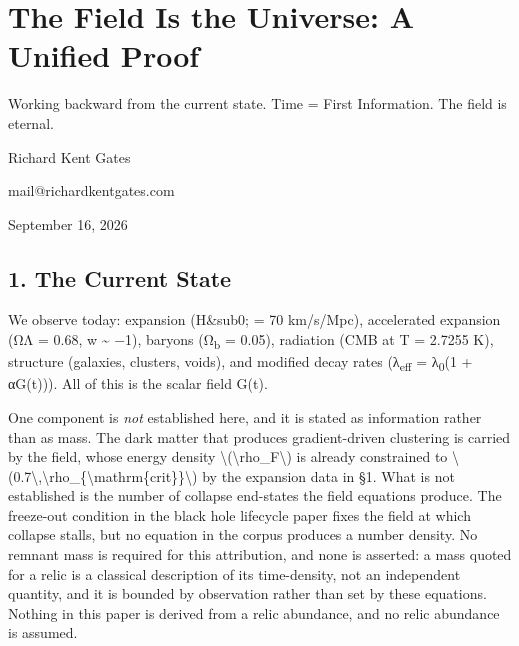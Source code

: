 \documentclass[
  10pt,
]{article}
\author{}
\date{}
\begin{document}
\hypertarget{the-field-is-the-universe-a-unified-proof}{%
\section{The Field Is the Universe: A Unified
Proof}\label{the-field-is-the-universe-a-unified-proof}}

Working backward from the current state. Time = First Information. The
field is eternal.

Richard Kent Gates

mail@richardkentgates.com

September 16, 2026

\hypertarget{the-current-state}{%
\subsection{1. The Current State}\label{the-current-state}}

We observe today: expansion (H\&sub0; = 70 km/s/Mpc), accelerated
expansion (ΩΛ = 0.68, w \textasciitilde{} −1), baryons
(Ω\textsubscript{b} = 0.05), radiation (CMB at T = 2.7255 K), structure
(galaxies, clusters, voids), and modified decay rates
(λ\textsubscript{eff} = λ\textsubscript{0}(1 + αG(t))). All of this is
the scalar field G(t).

One component is \emph{not} established here, and it is stated as
information rather than as mass. The dark matter that produces
gradient-driven clustering is carried by the field, whose energy density
\textbackslash(\textbackslash rho\_F\textbackslash) is already
constrained to
\textbackslash(0.7\textbackslash,\textbackslash rho\_\{\textbackslash mathrm\{crit\}\}\textbackslash)
by the expansion data in §1. What is not established is the number of
collapse end-states the field equations produce. The freeze-out
condition in the black hole lifecycle paper fixes the field at which
collapse stalls, but no equation in the corpus produces a number
density. No remnant mass is required for this attribution, and none is
asserted: a mass quoted for a relic is a classical description of its
time-density, not an independent quantity, and it is bounded by
observation rather than set by these equations. Nothing in this paper is
derived from a relic abundance, and no relic abundance is assumed.
\end{document}
